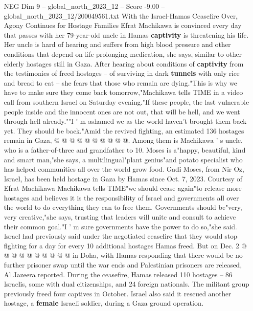 \begin{textsample}{NEG Dim 9 – global\_north\_2023\_12 – Score -9.00 – global\_north\_2023\_12/200049561.txt}  \label{ex:f9_neg_074}
With the Israel-Hamas Ceasefire Over, Agony Continues for Hostage Families Efrat Machikawa is convinced every day that passes with her 79-year-old uncle in Hamas \textbf{captivity} is threatening his life.
Her uncle is hard of hearing and suffers from high blood pressure and other conditions that depend on life-prolonging medication, she says, similar to other elderly hostages still in Gaza.
After hearing about conditions of \textbf{captivity} from the testimonies of freed hostages -- of surviving in dark \textbf{tunnels} with only rice and bread to eat -- she fears that those who remain are dying."This is why we have to make sure they come back tomorrow,"Machikawa tells TIME in a video call from southern Israel on Saturday evening."If these people, the last vulnerable people inside and the innocent ones are not out, that will be hell, and we went through hell already.""I ' m ashamed we as the world haven't brought them back yet.
They should be back."Amid the revived fighting, an estimated 136 hostages remain in Gaza, @ @ @ @ @ @ @ @ @ @.
Among them is Machikawa ' s uncle, who is a father-of-three and grandfather to 10.
Moses is a"happy, beautiful, kind and smart man,"she says, a multilingual"plant genius"and potato specialist who has helped communities all over the world grow food.
Gadi Moses, from Nir Oz, Israel, has been held hostage in Gaza by Hamas since Oct. 7, 2023.
Courtesy of Efrat Machikawa Machikawa tells TIME"we should cease again"to release more hostages and believes it is the responsibility of Israel and governments all over the world to do everything they can to free them.
Governments should be"very, very creative,"she says, trusting that leaders will unite and consult to achieve their common goal."I ' m sure governments have the power to do so,"she said.
Israel had previously said under the negotiated ceasefire that they would stop fighting for a day for every 10 additional hostages Hamas freed.
But on Dec. 2 @ @ @ @ @ @ @ @ @ @ in Doha, with Hamas responding that there would be no further prisoner swap until the war ends and Palestinian prisoners are released, Al Jazeera reported.
During the ceasefire, Hamas released 110 hostages -- 86 Israelis, some with dual citizenships, and 24 foreign nationals.
The militant group previously freed four captives in October.
Israel also said it rescued another hostage, a \textbf{female} Israeli soldier, during a Gaza ground operation.

\end{textsample}
